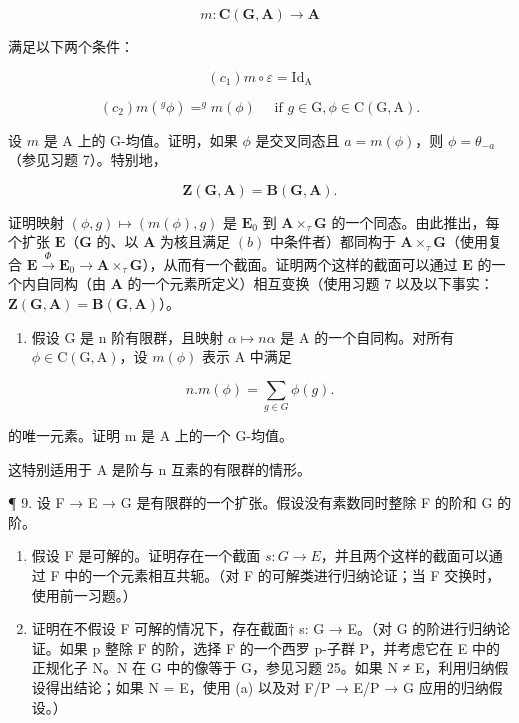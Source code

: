 \[
m \colon \mathbf {C} (\mathbf {G}, \mathbf {A}) \rightarrow \mathbf {A}
\]

满足以下两个条件：

\[
(c _ {1}) m \circ \varepsilon = \mathrm{Id} _ {\mathrm{A}}
\]

\[
(c _ {2}) m (^ {g} \phi) = ^ {g} m (\phi) \quad \text { if } g \in \mathrm{G}, \phi \in \mathrm{C} (\mathrm{G}, \mathrm{A}).
\]

设 \(m\) 是 A 上的 G-均值。证明，如果 \(\phi\) 是交叉同态且 \(a = m(\phi)\)，则 \(\phi = \theta_{-a}\)（参见习题 7）。特别地，

\[
\mathbf {Z} (\mathbf {G}, \mathbf {A}) = \mathbf {B} (\mathbf {G}, \mathbf {A}).
\]

证明映射 \((\phi, g) \mapsto (m(\phi), g)\) 是 \(\mathbf{E}_0\) 到 \(\mathbf{A} \times_{\tau} \mathbf{G}\) 的一个同态。由此推出，每个扩张 \(\mathbf{E}\)（\(\mathbf{G}\) 的、以 \(\mathbf{A}\) 为核且满足 \((b)\) 中条件者）都同构于 \(\mathbf{A} \times_{\tau} \mathbf{G}\)（使用复合 \(\mathbf{E} \xrightarrow{\Phi} \mathbf{E}_0 \to \mathbf{A} \times_{\tau} \mathbf{G}\)），从而有一个截面。证明两个这样的截面可以通过 \(\mathbf{E}\) 的一个内自同构（由 \(\mathbf{A}\) 的一个元素所定义）相互变换（使用习题 7 以及以下事实：\(\mathbf{Z}(\mathbf{G}, \mathbf{A}) = \mathbf{B}(\mathbf{G}, \mathbf{A})\)）。

\begin{enumerate}
\def\labelenumi{(\alph{enumi})}
\setcounter{enumi}{3}
\tightlist
\item
  假设 G 是 n 阶有限群，且映射 \(\alpha \mapsto n\alpha\) 是 A 的一个自同构。对所有 \(\phi \in \mathrm{C}(\mathrm{G}, \mathrm{A})\)，设 \(m(\phi)\) 表示 A 中满足
\end{enumerate}

\[
n. m (\phi) = \sum_ {g \in G} \phi (g).
\]

的唯一元素。证明 m 是 A 上的一个 G-均值。

这特别适用于 A 是阶与 n 互素的有限群的情形。

¶ 9. 设 F → E → G 是有限群的一个扩张。假设没有素数同时整除 F 的阶和 G 的阶。

\begin{enumerate}
\def\labelenumi{(\alph{enumi})}
\item
  假设 F 是可解的。证明存在一个截面 \(s: G \rightarrow E\)，并且两个这样的截面可以通过 F 中的一个元素相互共轭。（对 F 的可解类进行归纳论证；当 F 交换时，使用前一习题。）
\item
  证明在不假设 F 可解的情况下，存在截面† s: G → E。（对 G 的阶进行归纳论证。如果 p 整除 F 的阶，选择 F 的一个西罗 p-子群 P，并考虑它在 E 中的正规化子 N。N 在 G 中的像等于 G，参见习题 25。如果 N ≠ E，利用归纳假设得出结论；如果 N = E，使用 (a) 以及对 F/P → E/P → G 应用的归纳假设。）
\end{enumerate}

